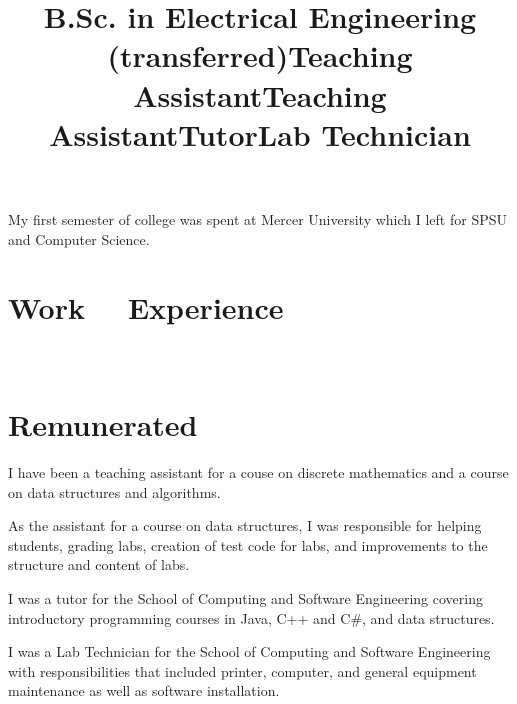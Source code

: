 \documentclass[margintitle,line]{res}
\renewcommand{\subsection}[1]{\section{\normalfont #1}}
\begin{document}
\begin{resume}
\title{B.Sc. in Electrical Engineering (transferred)}
\begin{position}
My first semester of college was spent at Mercer University which I left  for SPSU and Computer Science.
\end{position}


\section{Work \ \ Experience}
\ \\
\subsection{Remunerated}

\title{Teaching Assistant}
\begin{position}
 I have been a teaching assistant for a couse on discrete mathematics and a course on data structures and algorithms.
\end{position}

\title{Teaching Assistant}
\begin{position}
 As the assistant for a course on data structures, I was responsible for helping students, grading labs, creation of test code for labs, and improvements to the structure and content of labs.
\end{position}

\title{Tutor}
\begin{position}
I was a tutor for the School of Computing and Software Engineering covering introductory programming courses in Java, C++ and C\#, and data structures.
\end{position}

\title{Lab Technician}
\begin{position}
I was a Lab Technician  for the School of Computing and Software Engineering with responsibilities that included printer, computer, and general equipment maintenance as well as software installation.
\end{position}


\end{resume}
\end{document}
